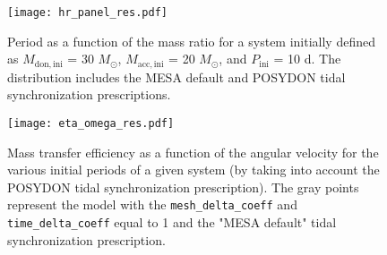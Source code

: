 \documentclass{aa}
\begin{document}
\begin{appendix}
\begin{figure}[!ht]
  \centering
  \texttt{[image: hr\_panel\_res.pdf]}
  \caption{Period as a function of the mass ratio for a system initially defined as $M_\mathrm{don,ini}$ = 30 $M_{\odot}$, $M_\mathrm{acc,ini}$ = 20 $M_{\odot}$, and $P_\mathrm{ini}$ = 10 d. The distribution includes the MESA default and POSYDON tidal synchronization prescriptions.}
  \label{fig:resolution_test_pvsq}
\end{figure}



\begin{figure}[!ht]
  \centering
  \texttt{[image: eta\_omega\_res.pdf]}
  \caption{Mass transfer efficiency as a function of the angular velocity for the various initial periods of a given system (by taking into account the POSYDON tidal synchronization prescription). The gray points represent the model with the \texttt{mesh\_delta\_coeff} and \texttt{time\_delta\_coeff} equal to 1 and the "MESA default" tidal synchronization prescription.}
  \label{fig:eta_omega_res}
\end{figure}





\end{appendix}
\end{document}
